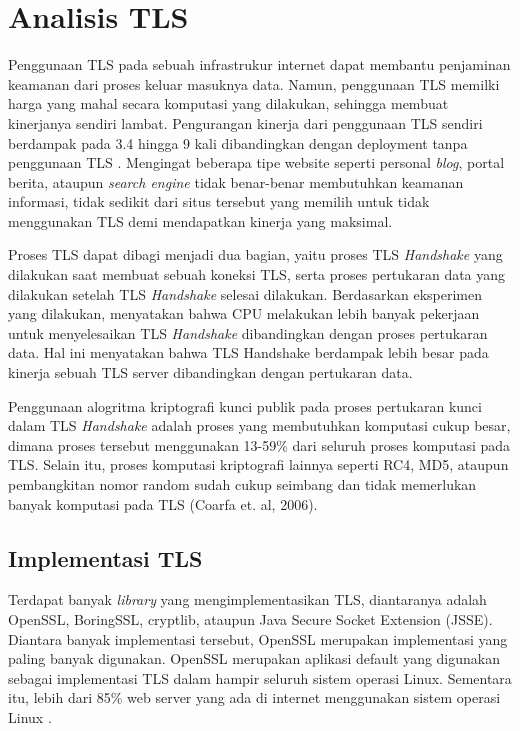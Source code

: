 
\section{Analisis TLS}
Penggunaan TLS pada sebuah infrastrukur internet dapat membantu penjaminan keamanan dari proses keluar masuknya data. Namun, penggunaan TLS memilki harga yang mahal secara komputasi yang dilakukan, sehingga membuat kinerjanya sendiri lambat. Pengurangan kinerja dari penggunaan TLS sendiri berdampak pada 3.4 hingga 9 kali dibandingkan dengan deployment tanpa penggunaan TLS \citep{perf_tls}. Mengingat beberapa tipe website seperti personal \textit{blog}, portal berita, ataupun \textit{search engine} tidak benar-benar membutuhkan keamanan informasi, tidak sedikit dari situs tersebut yang memilih untuk tidak menggunakan TLS demi mendapatkan kinerja yang maksimal.


Proses TLS dapat dibagi menjadi dua bagian, yaitu proses TLS \textit{Handshake} yang dilakukan saat membuat sebuah koneksi TLS, serta proses pertukaran data yang dilakukan setelah TLS \textit{Handshake} selesai dilakukan. Berdasarkan eksperimen yang dilakukan, \cite{perf_tls} menyatakan bahwa CPU melakukan lebih banyak pekerjaan untuk menyelesaikan TLS \textit{Handshake} dibandingkan dengan proses pertukaran data. Hal ini menyatakan bahwa TLS Handshake berdampak lebih besar pada kinerja sebuah TLS server dibandingkan dengan pertukaran data.

Penggunaan alogritma kriptografi kunci publik pada proses pertukaran kunci  dalam TLS \textit{Handshake} adalah proses yang membutuhkan komputasi cukup besar, dimana proses tersebut menggunakan 13-59\% dari seluruh proses komputasi pada TLS. Selain itu, proses komputasi kriptografi lainnya seperti RC4, MD5, ataupun pembangkitan nomor random sudah cukup seimbang dan tidak memerlukan banyak komputasi pada TLS (Coarfa et. al, 2006).

\subsection{Implementasi TLS}
Terdapat banyak \textit{library} yang mengimplementasikan TLS, diantaranya adalah OpenSSL, BoringSSL, cryptlib, ataupun Java Secure Socket Extension (JSSE). Diantara banyak implementasi tersebut, OpenSSL merupakan implementasi yang paling banyak digunakan. OpenSSL merupakan aplikasi default yang digunakan sebagai implementasi TLS dalam hampir seluruh sistem operasi Linux. Sementara itu, lebih dari 85\% web server yang ada di internet menggunakan sistem operasi Linux \citep{server_os_marketshare}.


